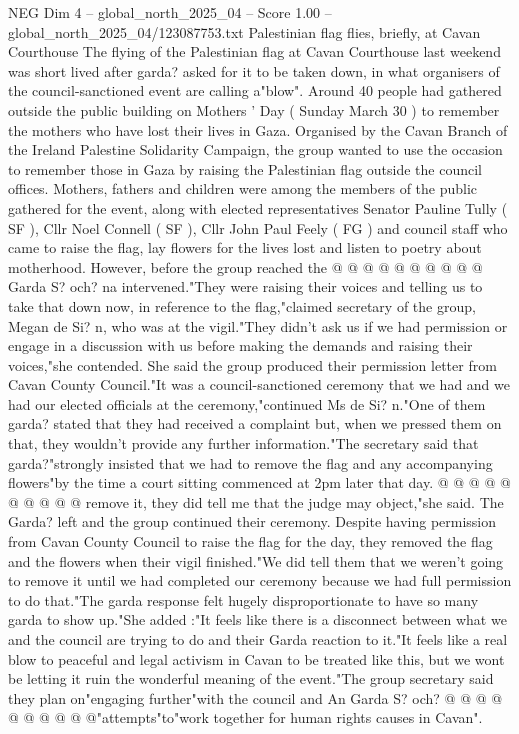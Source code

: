 \begin{textsample}{NEG Dim 4 – global\_north\_2025\_04 – Score 1.00 – global\_north\_2025\_04/123087753.txt}  \label{ex:f4_neg_248}
Palestinian flag flies, briefly, at Cavan Courthouse The flying of the Palestinian flag at Cavan Courthouse last weekend was short lived after garda? asked for it to be taken down, in what organisers of the council-sanctioned event are calling a"blow".
Around 40 people had gathered outside the public building on Mothers ' Day ( Sunday March 30 ) to remember the mothers who have lost their lives in Gaza.
Organised by the Cavan Branch of the Ireland Palestine Solidarity Campaign, the group wanted to use the occasion to remember those in Gaza by raising the Palestinian flag outside the council offices.
Mothers, fathers and children were among the members of the public gathered for the event, along with elected representatives Senator Pauline Tully ( SF ), Cllr Noel Connell ( SF ), Cllr John Paul Feely ( FG ) and council staff who came to raise the flag, lay flowers for the lives lost and listen to poetry about motherhood.
However, before the group reached the @ @ @ @ @ @ @ @ @ @ Garda S? och? na intervened."They were raising their voices and telling us to take that down now, in reference to the flag,"claimed secretary of the group, Megan de Si? n, who was at the vigil."They didn't ask us if we had permission or engage in a discussion with us before making the demands and raising their voices,"she contended.
She said the group produced their permission letter from Cavan County Council."It was a council-sanctioned ceremony that we had and we had our elected officials at the ceremony,"continued Ms de Si? n."One of them garda? stated that they had received a complaint but, when we pressed them on that, they wouldn't provide any further information."The secretary said that garda?"strongly insisted that we had to remove the flag and any accompanying flowers"by the time a court sitting commenced at 2pm later that day. @ @ @ @ @ @ @ @ @ @ remove it, they did tell me that the judge may object,"she said.
The Garda? left and the group continued their ceremony.
Despite having permission from Cavan County Council to raise the flag for the day, they removed the flag and the flowers when their vigil finished."We did tell them that we weren't going to remove it until we had completed our ceremony because we had full permission to do that."The garda response felt hugely disproportionate to have so many garda to show up."She added :"It feels like there is a disconnect between what we and the council are trying to do and their Garda reaction to it."It feels like a real blow to peaceful and legal activism in Cavan to be treated like this, but we wont be letting it ruin the wonderful meaning of the event."The group secretary said they plan on"engaging further"with the council and An Garda S? och? @ @ @ @ @ @ @ @ @ @"attempts"to"work together for human rights causes in Cavan".

\end{textsample}
